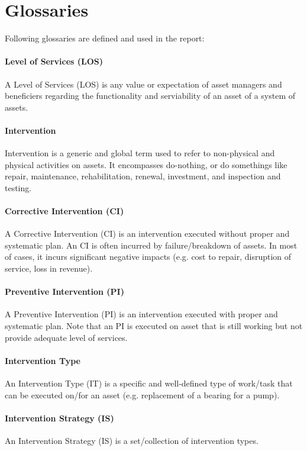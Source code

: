 \section{Glossaries}
Following glossaries are defined and used in the report:

\paragraph{\textbf{Level of Services (LOS)}}
A Level of Services (LOS) is any value or expectation of asset managers and beneficiers regarding the functionality and serviability of an asset of a system of assets.

\paragraph{\textbf{Intervention}}
Intervention is a generic and global term used to refer to non-physical and physical activities on assets. It encompasses do-nothing, or do somethings like repair, maintenance, rehabilitation, renewal, investment, and inspection and testing.

\paragraph{\textbf{Corrective Intervention (CI)}}
A Corrective Intervention (CI) is an intervention executed without proper and systematic plan. An CI is often incurred by failure/breakdown of assets. In most of cases, it incurs significant negative impacts (e.g. cost to repair, disruption of service, loss in revenue).

\paragraph{\textbf{Preventive Intervention (PI)}}
A Preventive Intervention (PI) is an intervention executed with proper and systematic plan. Note that an PI is executed on asset that is still working but not provide adequate level of services.

\paragraph{\textbf{Intervention Type}}
An Intervention Type (IT) is a specific and well-defined type of work/task that can be executed on/for an asset (e.g. replacement of a bearing for a pump).

\paragraph{\textbf{Intervention Strategy (IS)}}
An Intervention Strategy (IS) is a set/collection of intervention types.

